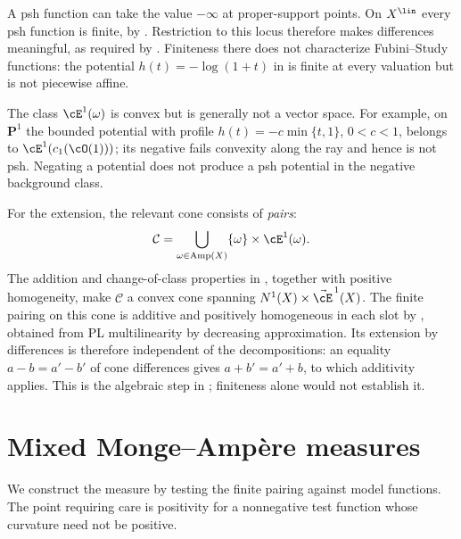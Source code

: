 \begin{remark}
\label{rem:ch46-vector-space}
A psh function can take the value $-\infty$ at proper-support points.
On $X^{\lin}$ every psh function is finite, by
\cite[Corollary~4.17]{BJ22}.  Restriction to this locus therefore
makes differences meaningful, as required by
.  Finiteness there does not characterize
Fubini--Study functions: the potential $h(t)=-\log(1+t)$ in
 is finite at every valuation but is not piecewise
affine.

The class $\cE^1(\omega)$ is convex but is generally not a vector space.
For example, on $\mathbf P^1$ the bounded potential with profile
$h(t)=-c\min\{t,1\}$, $0<c<1$, belongs to $\cE^1(c_1(\cO(1)))$;
its negative fails convexity along the ray and hence is not psh.
Negating a potential does not produce a psh potential in the negative
background class.

For the extension, the relevant cone consists of \emph{pairs}:
\[
 \mathcal C
 =\bigcup_{\omega\in\operatorname{Amp}(X)}
       \{\omega\}\times\cE^1(\omega).
\]
The addition and change-of-class properties in ,
together with positive homogeneity, make $\mathcal C$ a convex cone
spanning $N^1(X)\times\vec{\cE}^{\,1}(X)$.  The finite pairing on this
cone is additive and positively homogeneous in each slot by
\cite[Proposition~7.2]{BJ22}, obtained from PL multilinearity by
decreasing approximation.  Its extension
by differences is therefore independent of the decompositions: an
equality $a-b=a'-b'$ of cone differences gives $a+b'=a'+b$, to which
additivity applies.  This is the algebraic step in
\cite[Theorem~7.14]{BJ22}; finiteness alone would not establish it.
\end{remark}

\section{Mixed Monge--Amp\`ere measures}
\label{sec:ch46-mixed}

We construct the measure by testing the finite pairing against model
functions.  The point requiring care is positivity for a nonnegative
test function whose curvature need not be positive.

